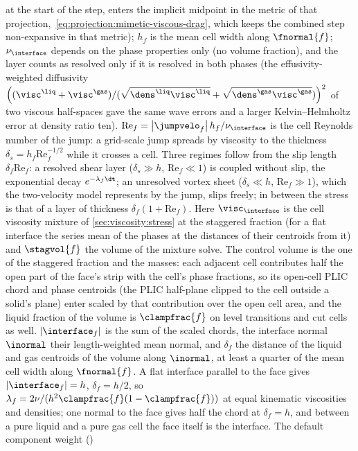 at the start of the step, enters the implicit midpoint in the metric of that
projection,~\cref{eq:projection:mimetic-viscous-drag}, which keeps the
combined step non-expansive in that metric); $h_f$ is the mean cell
width along $\fnormal{f}$; $\nu_{\interface}$ depends on the phase properties
only (no volume fraction), and the layer counts as resolved only if it is
resolved in both phases (the effusivity-weighted diffusivity
$\roundpar{(\visc^{\liq}+\visc^{\gas})/(\sqrt{\dens^{\liq}\visc^{\liq}}+\sqrt{\dens^{\gas}\visc^{\gas}})}^2$
of two viscous half-spaces gave the same wave errors and a larger
Kelvin--Helmholtz error at density ratio ten). $\mathrm{Re}_f=\abs{\jumpvelo_f}h_f/\nu_{\interface}$ is the
cell Reynolds number of the jump: a grid-scale jump spreads by viscosity to the
thickness $\delta_s=h_f\mathrm{Re}_f^{-1/2}$ while it crosses a cell. Three
regimes follow from the slip length $\delta_f\mathrm{Re}_f$: a resolved shear
layer ($\delta_s\gg h$, $\mathrm{Re}_f\ll1$) is coupled without slip, the
exponential decay $e^{-\lambda_f\dt}$; an unresolved vortex sheet
($\delta_s\ll h$, $\mathrm{Re}_f\gg1$), which the two-velocity model
represents by the jump, slips freely; in between the stress is that of a
layer of thickness $\delta_f(1+\mathrm{Re}_f)$.
Here $\visc_{\interface}$ is the cell viscosity mixture of
\cref{sec:viscosity:stress} at the staggered fraction (for a flat interface
the series mean of the phases at the distances of their centroids from it)
and $\stagvol{f}$ the volume of the mixture solve. The control volume is the
one of the staggered fraction and the masses: each adjacent cell contributes
half the open part of the face's strip with the cell's phase fractions, so
its open-cell PLIC chord and phase centroids (the PLIC half-plane clipped to
the cell outside a solid's plane) enter scaled by that contribution over the
open cell area, and the liquid fraction of the volume is $\clampfrac{f}$ on
level transitions and cut cells as well. $\abs{\interface_f}$ is the sum of
the scaled chords, the interface normal $\inormal$ their length-weighted mean
normal, and $\delta_f$ the distance of the liquid and gas centroids of the
volume along $\inormal$, at least a quarter of the mean cell width along
$\fnormal{f}$. A flat interface parallel to the face gives
$\abs{\interface_f}=h$, $\delta_f=h/2$, so
$\lambda_f=2\nu/(h^2\clampfrac{f}(1-\clampfrac{f}))$ at equal kinematic
viscosities and densities; one normal to the face gives half the chord at
$\delta_f=h$, and between a pure liquid and a pure gas cell the face itself
is the interface. The default component weight ()
